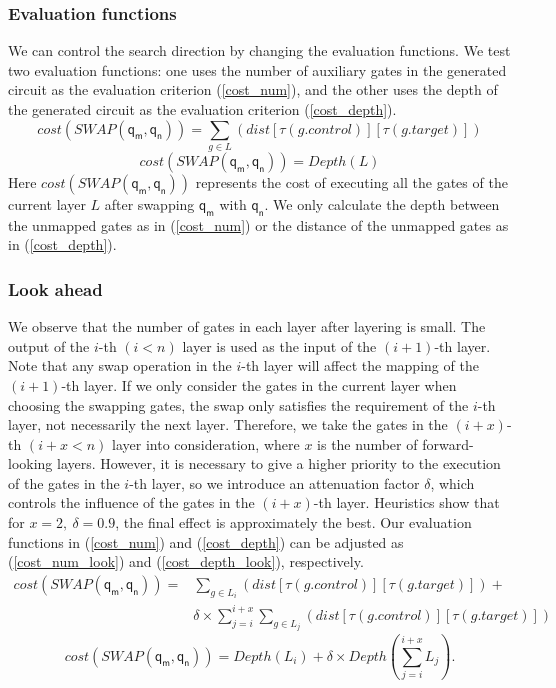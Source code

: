 \documentclass[runningheads]{llncs}
\begin{document}
\subsubsection{Evaluation functions }
We can control the search direction by changing the evaluation functions.
We test two evaluation functions: one uses the number of auxiliary gates in the generated circuit as the evaluation criterion (\ref{cost_num}),  and the other uses the depth of the generated circuit as the evaluation criterion  (\ref{cost_depth}).
\begin{equation}
	cost(SWAP(\textsf{q}_\textsf{m},\textsf{q}_\textsf{n}))= \sum_{g \in L}(dist[\tau(g.control)][\tau(g.target)])
	\label{cost_num}
\end{equation}
	\begin{equation}
		cost(SWAP(\textsf{q}_\textsf{m},\textsf{q}_\textsf{n}))= Depth(L)
		\label{cost_depth}
		\end{equation}
Here $cost(SWAP(\textsf{q}_\textsf{m},\textsf{q}_\textsf{n}))$ represents the cost of executing all the gates of the current layer $L$ 
after swapping $\textsf{q}_\textsf{m}$ with $\textsf{q}_\textsf{n}$. We only calculate the depth between the unmapped gates as in (\ref{cost_num}) or the distance of the unmapped gates as in (\ref{cost_depth}).

\subsubsection{Look ahead }
We observe that the number of gates in each layer after layering is small. The output of the $i$-th $(i<n)$ layer is used as the input of the $(i+1)$-th layer. Note that any swap operation in the $i$-th layer will affect the mapping of the $(i+1)$-th layer. If we only consider the gates in the current layer when choosing the swapping gates, the swap only satisfies the requirement of the $i$-th layer, not necessarily the next layer. Therefore, we take the gates in the $(i+x)$-th $(i+x<n)$ layer into consideration, where $x$ is the number of forward-looking layers. However, it is necessary to give a higher priority to the execution of the gates in the $i$-th layer, so we introduce an attenuation factor $\delta$, which controls the influence of the gates in the $(i+x)$-th layer. Heuristics show that for $x=2,\ \delta=0.9$, the final effect is  approximately the best. Our evaluation functions in (\ref{cost_num}) and  (\ref{cost_depth}) can be adjusted as
(\ref{cost_num_look}) and  (\ref{cost_depth_look}), respectively.
 \begin{equation}
	 	\begin{aligned}
			cost(SWAP(\textsf{q}_\textsf{m},\textsf{q}_\textsf{n}))=&\sum_{g \in L_{i}}(dist[\tau(g.control)][\tau(g.target)])+\\
	&\delta \times \sum_{j=i}^{i+x}\sum_{g \in L_{j}}(dist[\tau(g.control)][\tau(g.target)])
	\label{cost_num_look}
	\end{aligned}
 \end{equation}
	\begin{equation}
		cost(SWAP(\textsf{q}_\textsf{m},\textsf{q}_\textsf{n}))= Depth(L_{i})+\delta \times Depth(\sum_{j=i}^{i+x}L_{j}).
		\label{cost_depth_look}
		\end{equation}
\end{document}
